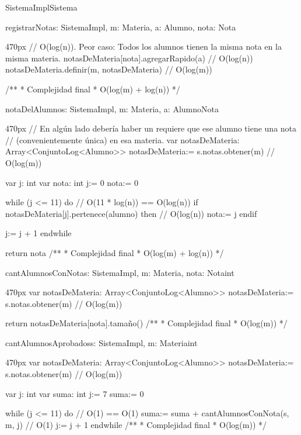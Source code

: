 \documentclass[10pt,a4paper]{article}
\begin{document}
\begin{ModuloImplements}{SistemaImpl}{Sistema}
\begin{proc}{registrarNota}{\Inout s: SistemaImpl, \In m: Materia, \In a: Alumno, \In nota: Nota}{}
\begin{ImplementationCode}{470px}
      // O(log(n)). Peor caso: Todos los alumnos tienen la misma nota en la misma materia.
      notasDeMateria[nota].agregarRapido(a) // O(log(n))
      notasDeMateria.definir(m, notasDeMateria) // O(log(m))

      /**
       * Complejidad final
       * O(log(m) + log(n))
       */
      \end{ImplementationCode}
  \end{proc}

  \begin{proc}{notaDelAlumno}{\In s: SistemaImpl, \In m: Materia, \In a: Alumno}{Nota}
    \begin{ImplementationCode}{470px}
      // En algún lado debería haber un requiere que ese alumno tiene una nota
      // (convenientemente única) en esa materia.
      var notasDeMateria: Array<ConjuntoLog<Alumno>>
          notasDeMateria:= s.notas.obtener(m) // O(log(m))

      var j: int
      var nota: int
          j:= 0
          nota:= 0

      while (j <= 11) do // O(11 * log(n)) == O(log(n))
        if notasDeMateria[j].pertenece(alumno) then // O(log(n))
          nota:= j
        endif

        j:= j + 1
      endwhile

      return nota
      /**
       * Complejidad final
       * O(log(m) + log(n))
       */
    \end{ImplementationCode}
  \end{proc}

  \begin{proc}{cantAlumnosConNota}{\In s: SistemaImpl, \In m: Materia, \In nota: Nota}{int}
    \begin{ImplementationCode}{470px}
      var notasDeMateria: Array<ConjuntoLog<Alumno>>
          notasDeMateria:= s.notas.obtener(m) // O(log(m))

      return notasDeMateria[nota].tamaño()
      /**
       * Complejidad final
       * O(log(m))
       */
    \end{ImplementationCode}
  \end{proc}

  \begin{proc}{cantAlumnosAprobados}{\In s: SistemaImpl, \In m: Materia}{int}
    \begin{ImplementationCode}{470px}
      var notasDeMateria: Array<ConjuntoLog<Alumno>>
          notasDeMateria:= s.notas.obtener(m) // O(log(m))

      var j: int
      var suma: int
          j:= 7
          suma:= 0

      while (j <= 11) do // O(1) == O(1)
        suma:= suma + cantAlumnosConNota(s, m, j) // O(1)
        j:= j + 1
      endwhile
      /**
       * Complejidad final
       * O(log(m))
       */
    \end{ImplementationCode}
  \end{proc}
\end{ModuloImplements}
\end{document}
